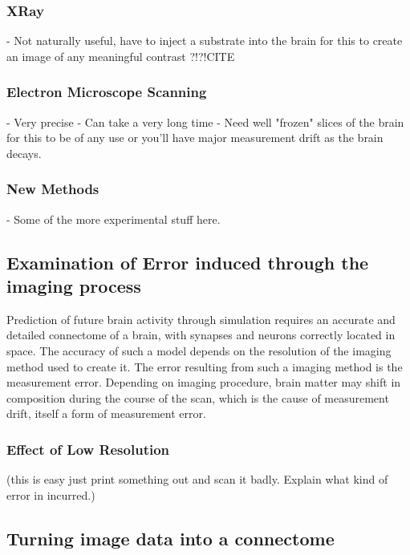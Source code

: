 \subsubsection*{XRay}

- Not naturally useful, have to inject a substrate into the brain for this to
create an image of any meaningful contrast ?!?!CITE

\subsubsection*{Electron Microscope Scanning}

- Very precise
- Can take a very long time
- Need well "frozen" slices of the brain for this to be of any use or you'll
have major measurement drift as the brain decays.

\subsubsection*{New Methods}

- Some of the more experimental stuff here.

\subsection[Error induced through noise]{Examination of Error induced through the imaging process}

Prediction of future brain activity through simulation requires an accurate and
detailed connectome of a brain, with synapses and neurons correctly located in
space.\autocite{bostrom_whole_2008} The accuracy of such a model depends on the
resolution of the imaging method used to create it. The error resulting from
such a imaging method is the measurement error. Depending on imaging procedure, brain matter may shift in composition during the course of the scan, which is the cause of measurement drift, itself a form of measurement error.



\subsubsection[Error induced through low resolution]{Effect of Low Resolution} 
(this is easy just print something out
and scan it badly. Explain what kind of error in incurred.)

\subsection{Turning image data into a connectome}